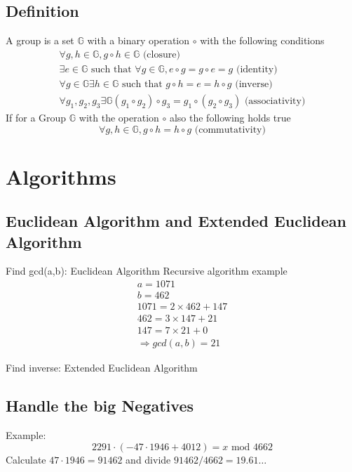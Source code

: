 \documentclass[a4paper]{article}
\begin{document}
\subsection{Definition}
A group is a set $\mathbb{G}$ with a binary operation $\circ$ with the following conditions
\begin{equation}
    \begin{split}
	\forall g,h \in \mathbb{G}, g \circ h \in \mathbb{G} \text{ (closure)}\\
	\exists e \in \mathbb{G} \text{ such that } \forall g \in \mathbb{G}, e \circ g = g \circ e = g \text{ (identity)} \\
	\forall g \in \mathbb{G} \exists h \in \mathbb{G} \text{ such that } g \circ h = e = h \circ g \text{ (inverse)}\\
	\forall g_1,g_2,g_3 \exists \mathbb{G} (g_1 \circ g_2) \circ g_3 = g_1 \circ (g_2 \circ g_3) \text{ (associativity)}
    \end{split}
    \label{group_definition}
\end{equation}
If for a Group $\mathbb{G}$ with the operation $\circ$ also the following holds true 
\begin{equation}
    \forall g,h \in \mathbb{G}, g \circ h = h \circ g \text{ (commutativity)}
    \label{group_abelian_defintion}
\end{equation}

\section{Algorithms}
\subsection{Euclidean Algorithm and Extended Euclidean Algorithm}
Find gcd(a,b): Euclidean Algorithm
Recursive algorithm example 
\begin{equation}
    \begin{split}
	a = 1071 \\
	b = 462 \\
	1071 = 2 \times 462 +  147 \\
	462 = 3 \times  147 + 21 \\
	147 = 7 \times 21 + 0 \\ 
	\Rightarrow gcd(a,b) = 21
    \end{split}
        \label{euclidean_example}
\end{equation}

Find inverse: Extended Euclidean Algorithm
\subsection{Handle the big Negatives}
Example:
\[ 2291 \cdot (-47 \cdot 1946 + 4012) = x \text{ mod } 4662\]
Calculate $47 \cdot 1946 = 91462$ and divide $91462/4662 = 19.61\dots$
\end{document}
